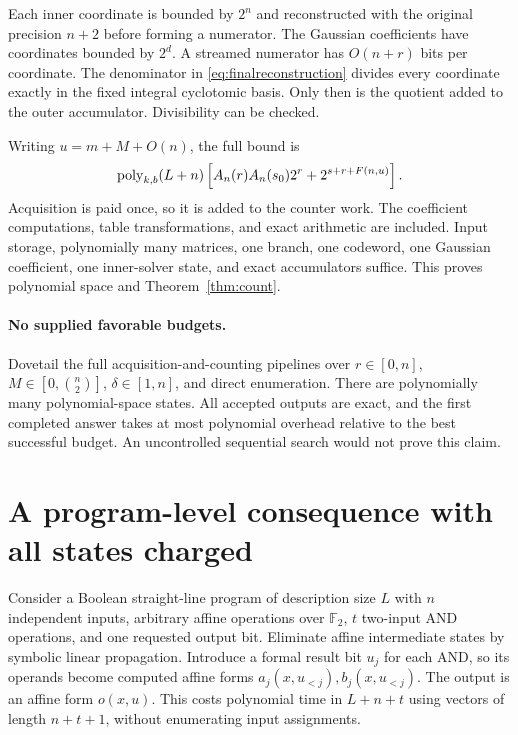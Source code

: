 \documentclass[11pt,a4paper]{article}
\theoremstyle{remark}\newtheorem{remark}[theorem]{Remark}
\newcommand{\F}{\mathbb F}\newcommand{\Z}{\mathbb Z}\newcommand{\Q}{\mathbb Q}
\begin{document}
Each inner coordinate is bounded by $2^n$ and reconstructed
with the original precision $n+2$ before forming a numerator.
The Gaussian coefficients have coordinates bounded by $2^d$.
A streamed numerator has $O(n+r)$ bits per coordinate.
The denominator in \eqref{eq:finalreconstruction} divides
every coordinate exactly in the fixed integral cyclotomic
basis. Only then is the quotient added to the outer
accumulator. Divisibility can be checked.

Writing $u=m+M+O(n)$, the full bound is
\begin{equation}\label{eq:total}
\operatorname{poly}_{k,b}(L+n)
\left[
A_n(r)A_n(s_0)2^r+
2^{s+r+F(n,u)}
\right].
\end{equation}
Acquisition is paid once, so it is added to the counter work.
The coefficient computations, table transformations, and exact
arithmetic are included. Input storage, polynomially many
matrices, one branch, one codeword, one Gaussian coefficient,
one inner-solver state, and exact accumulators suffice.
This proves polynomial space and Theorem~\ref{thm:count}.

\paragraph{No supplied favorable budgets.}
Dovetail the full acquisition-and-counting pipelines over
$r\in[0,n]$, $M\in[0,\binom n2]$, $\delta\in[1,n]$,
and direct enumeration. There are polynomially many
polynomial-space states. All accepted outputs are exact,
and the first completed answer takes at most polynomial
overhead relative to the best successful budget. An
uncontrolled sequential search would not prove this claim.

\section{A program-level consequence with all states charged}
\label{sec:program}
Consider a Boolean straight-line program of description size $L$
with $n$ independent inputs, arbitrary affine operations over
$\F_2$, $t$ two-input AND operations, and one requested output
bit. Eliminate affine intermediate states by symbolic linear
propagation. Introduce a formal result bit $u_j$ for each AND,
so its operands become computed affine forms
$a_j(x,u_{<j}),b_j(x,u_{<j})$. The output is an affine form
$o(x,u)$. This costs polynomial time in $L+n+t$ using vectors
of length $n+t+1$, without enumerating input assignments.
\end{document}

